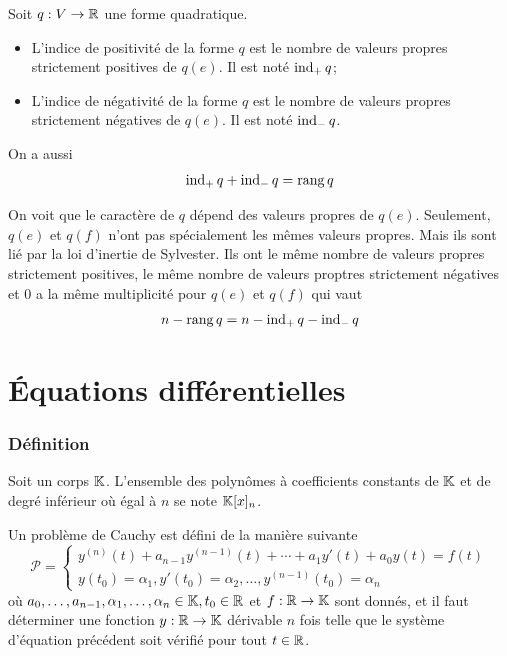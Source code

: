 \begin{myprop}
	Soit $q: V \to \mathbb{R}$ une forme quadratique.
	\begin{itemize}
		\item L'indice de positivité de la forme $q$ est le nombre de valeurs propres strictement positives de $q(e)$.
			Il est noté $\operatorname{ind}_+q$;
		\item L'indice de négativité de la forme $q$ est le nombre de valeurs propres strictement négatives de $q(e)$.
			Il est noté $\operatorname{ind}_-q$.
	\end{itemize}
	On a aussi
	\[ \operatorname{ind}_+q + \operatorname{ind}_-q = \operatorname{rang} q \]
\end{myprop}

\begin{myrem}
	On voit que le caractère de $q$ dépend des valeurs propres de $q(e)$.
	Seulement, $q(e)$ et $q(f)$ n'ont pas spécialement les mêmes valeurs propres.
	Mais ils sont lié par la loi d'inertie de Sylvester.
	Ils ont le même nombre de valeurs propres strictement positives,
	le même nombre de valeurs proptres strictement négatives
	et 0 a la même multiplicité pour $q(e)$ et $q(f)$ qui vaut
	\[ n - \operatorname{rang} q = n - \operatorname{ind}_+q - \operatorname{ind}_-q \]
\end{myrem}

\part{Équations différentielles}

\section{Définition}

\begin{mynota}
	Soit un corps $\mathbb{K}$.
	L'ensemble des polynômes à coefficients constants de $\mathbb{K}$ et de degré inférieur où égal à $n$ se note $\mathbb{K}[x]_n$.
\end{mynota}

\begin{mydef}
	Un problème de Cauchy est défini de la manière suivante
	\[ \mathcal{P} = \left\{
	\begin{array}{l}
		y^{(n)}(t) + a_{n-1}y^{(n-1)}(t) + \cdots + a_1 y'(t) + a_0 y(t) = f(t) \\
		y(t_0) = \alpha_1, y'(t_0) = \alpha_2, \dots , y^{(n-1)}(t_0) = \alpha_n
	\end{array} \right.
	\]
	où $a_0, \dots, a_{n-1}, \alpha_1, \dots, \alpha_n \in \mathbb{K}, t_0 \in \mathbb{R}$ et $f: \mathbb{R} \to \mathbb{K}$ sont donnés,
	et il faut déterminer une fonction $y: \mathbb{R} \to \mathbb{K}$ dérivable $n$ fois
	telle que le système d'équation précédent soit vérifié pour tout $t \in \mathbb{R}$.
\end{mydef}

